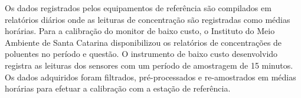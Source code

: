 Os dados registrados pelos equipamentos de referência são compilados em relatórios diários onde as leituras de concentração são registradas como médias horárias. Para a calibração do monitor de baixo custo, o Instituto do Meio Ambiente de Santa Catarina disponibilizou os relatórios de concentrações de poluentes no período e questão. O instrumento de baixo custo desenvolvido registra as leituras dos sensores com um período de amostragem de 15 minutos. Os dados adquiridos foram filtrados, pré-processados e re-amostrados em médias horárias para efetuar a calibração com a estação de referência.
